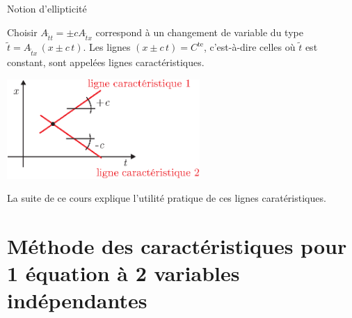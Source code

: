 \documentclass[
mode=present,    %
paper=a4paper,   %
orient=landscape,
display=slides,   %
size=10pt,
style=romain   %
]{powerdot}
\begin{document}
\begin{slide}[toc=]{Notion d'ellipticité}

Choisir $A_{\tilde{t}t} = \pm c A_{\tilde{t}x}$ correspond à un changement de variable du type $\tilde{t} = A_{\tilde{t}x} \, (x\pm c\,t)$. Les lignes $(x\pm c\,t)=C^{\text{te}}$, c'est-à-dire celles où $\tilde{t}$ est constant, sont appelées lignes caractéristiques.

\bigskip

    \centerline{\includegraphics[width=0.55\textwidth]{hyperbolic.eps} }


La suite de ce cours explique l'utilité pratique de ces lignes caratéristiques.


\end{slide}



\section[toc=Carac. 2D - 1equ.]{Méthode des caractéristiques pour 1 équation à 2 variables indépendantes}
\end{document}
